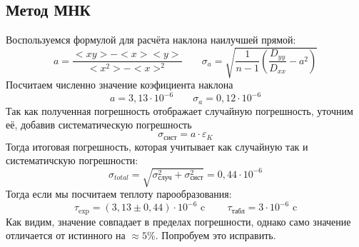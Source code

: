 \documentclass[a4paper,20pt]{article}
\theoremstyle{definition}
\begin{document}
\subsection{Метод МНК}
Воспользуемся формулой для расчёта наклона наилучшей прямой:
\begin{equation}
	a = \frac{<xy> - <x><y>}{<x^2>-<x>^2} \;\;\;\;\;\;\; \sigma_a = \sqrt{\frac{1}{n-1}(\frac{D_{yy}}{D_{xx}} - a^2)} 
\end{equation}
Посчитаем численно значение коэфициента наклона
\begin{equation}
	a = 3,13 \cdot10^{-6} \;\;\;\;\;\;\; \sigma_a = 0,12\cdot10^{-6}
\end{equation}
Так как полученная погрешность отображает случайную погрешность, уточним её, добавив систематическую погрешность
\begin{equation}
	\sigma_{\text{сист}} = a \cdot \varepsilon_{K}
\end{equation}
Тогда итоговая погрешность, которая учитывает как случайную так и систематичскую погрешности:
\begin{equation}
	\sigma_{total} = \sqrt{\sigma_{\text{случ}}^2 + \sigma_{\text{сист}}^2} = 0,44\cdot10^{-6} 
\end{equation}
Тогда если мы посчитаем теплоту парообразования:
\begin{equation}
	\tau_{\text{exp}} = (3,13 \pm 0,44 )\cdot10^{-6} \text{     c} \;\;\;\;\;\;\;\; \tau_{\text{табл}} = 3\cdot10^{-6}  \text{     c}
\end{equation}
Как видим, значение совпадает в пределах погрешности, однако само значение отличается от истинного на $\approx 5\%$. Попробуем это исправить.
\end{document}
